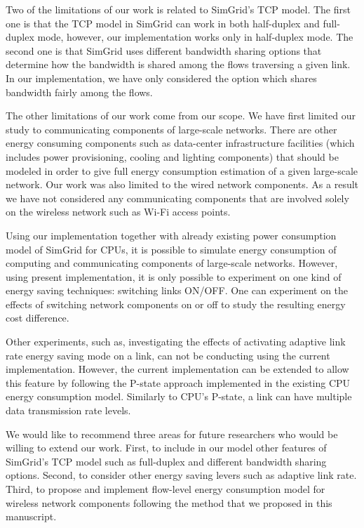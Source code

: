Two of the limitations of our work is related to SimGrid's TCP model. The first one is that the TCP model in SimGrid can work in both half-duplex and full-duplex mode, however, our implementation works only in half-duplex mode. The second one  is that SimGrid uses different bandwidth sharing options that determine how the bandwidth is shared among the flows traversing a given link. In our implementation, we have only considered the option which shares bandwidth fairly among the flows. 

The other limitations of our work come from our scope. We have first limited our study to communicating components of large-scale networks. There are other energy consuming components such as data-center infrastructure facilities (which includes power provisioning, cooling and lighting components) that should be modeled in order to give full energy consumption estimation of a given large-scale network. Our work was also limited to the wired network components. As a result we have not considered any communicating components that are involved solely on the wireless network such as Wi-Fi access points. 

Using our implementation together with already existing power consumption model of SimGrid for CPUs, it is possible to simulate energy consumption of computing and communicating components of large-scale networks. However, using present implementation, it is only possible to experiment on one kind of energy saving techniques: switching links ON/OFF. One can experiment on the effects of switching network components on or off to study the resulting energy cost difference. 

Other experiments, such as, investigating the effects of activating adaptive link rate energy saving mode on a link, can not be conducting using the current implementation. However, the current implementation can be extended to allow this feature by following the P-state approach implemented in the existing CPU energy consumption model. Similarly to CPU's P-state, a link can have multiple data transmission rate levels. 

We would like to recommend three areas for future researchers who would be willing to extend our work. First, to include in our model other features of SimGrid's TCP model such as full-duplex and different bandwidth sharing options.  Second, to consider other energy saving levers such as adaptive link rate. Third, to propose and implement flow-level energy consumption model for wireless network components following the method that we proposed in this manuscript. 
